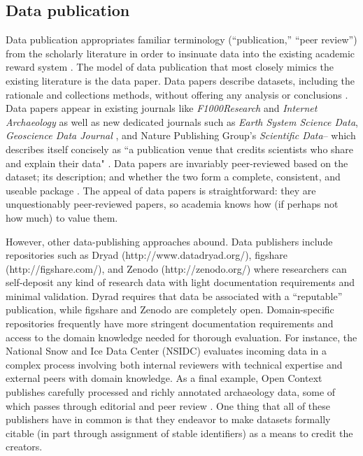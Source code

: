 \documentclass[10pt]{article}
\begin{document}
\subsection*{Data publication}
 
Data publication appropriates familiar terminology (``publication,'' ``peer review'') from the scholarly literature in order to insinuate data into the existing academic reward system \cite{costello_motivating_2009, lawrence_data_2011, atici_other_2012}.
The model of data publication that most closely mimics the existing literature is the data paper.
Data papers describe datasets, including the rationale and collections methods, without offering any analysis or conclusions \cite{newman_data_2009, callaghan_processes_2013}.
Data papers appear in existing journals like \emph{F1000Research} and \emph{Internet Archaeology} as well as new dedicated journals such as \emph{Earth System Science Data}, \emph{Geoscience Data Journal} \cite{allan_geoscience_2014}, and Nature Publishing Group's \emph{Scientific Data}-- which describes itself concisely as ``a publication venue that credits scientists who share and explain their data"  \cite{editors_more_2014}.
Data papers are invariably peer-reviewed based on the dataset; its description; and whether the two form a complete, consistent, and useable package \cite{lawrence_data_2011}.
The appeal of data papers is straightforward: they are unquestionably peer-reviewed papers, so academia knows how (if perhaps not how much) to value them.

However, other data-publishing approaches abound.
Data publishers include repositories such as Dryad (http://www.datadryad.org/), figshare (http://figshare.com/), and Zenodo (http://zenodo.org/) where researchers can self-deposit any kind of research data with light documentation requirements and minimal validation. 
Dyrad requires that data be associated with a ``reputable'' publication, while figshare and Zenodo are completely open.
Domain-specific repositories frequently have more stringent documentation requirements and access to the domain knowledge needed for thorough evaluation.
For instance, the National Snow and Ice Data Center (NSIDC) evaluates incoming data in a complex process involving both internal reviewers with technical expertise and external peers with domain knowledge\cite{weaver_data_2012}.
As a final example, Open Context publishes carefully processed and richly annotated archaeology data, some of which passes through editorial and peer review \cite{kansa_we_2013}.
One thing that all of these publishers have in common is that they endeavor to make datasets formally citable (in part through assignment of stable identifiers) as a means to credit the creators.
\end{document}
